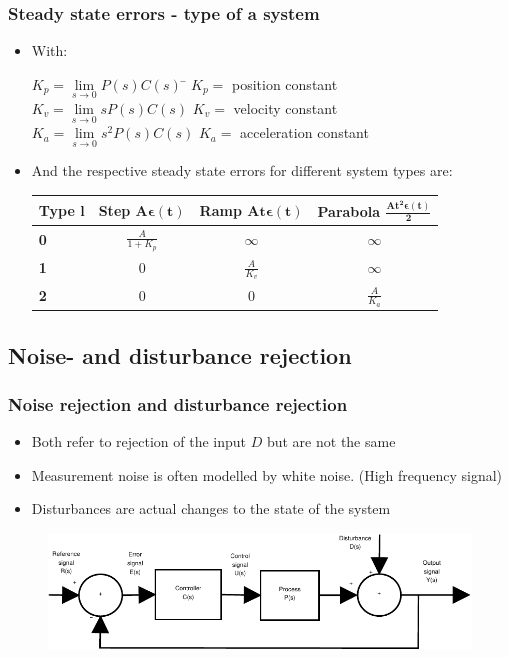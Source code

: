 \begin{frame}
	\frametitle{Steady state errors - type of a system}
	\begin{itemize}
		\item With:
			\begin{tabbing}
			$K_p = \lim\limits_{s \rightarrow 0} P(s)C(s)$ 
			\hspace{2em} \= $K_p = $ position constant \\
			$K_v = \lim\limits_{s \rightarrow 0}s P(s)C(s)$ \> $K_v = $ velocity constant \\
			$K_a = \lim\limits_{s \rightarrow 0}s^2 P(s)C(s)$ \> $K_a = $ acceleration constant
			\end{tabbing}
		\item And the respective steady state errors for different system types are:
		\begin{tabular}{|l|c|c|c|}
			\hline \textbf{Type} $\mathbf{l}$ & \textbf{Step} $\mathbf{A \boldsymbol{\epsilon} (t)}$ & \textbf{Ramp} $\mathbf{At \boldsymbol{\epsilon} (t)}$ & \textbf{Parabola} $\mathbf{\frac{At^2 \boldsymbol{\epsilon} (t)}{2}}$ \\ 
			\hline \textbf{0} & $\frac{A}{1 + K_p}$ & $\infty$ & $\infty$ \\ 
			\hline \textbf{1} & 0 & $\frac{A}{K_v}$ & $\infty$ \\ 
			\hline \textbf{2} & 0 & 0 & $\frac{A}{K_a}$ \\ 
			\hline 
		\end{tabular} 
	\end{itemize}
\end{frame}


\subsection[Noise- and disturbance rejection]{Noise- and disturbance rejection}

\begin{frame}
	\frametitle{Noise rejection and disturbance rejection}
	\begin{itemize}
		\item Both refer to rejection of the input $D$ but are not the same
		\item Measurement noise is often modelled by white noise. (High frequency signal)
		\item Disturbances are actual changes to the state of the system
	\end{itemize}
\begin{figure}
\centering
\includegraphics[width=0.7\linewidth]{Closed-Loop}
\label{fig:Closed-Loop3}
\end{figure}
\end{frame}



